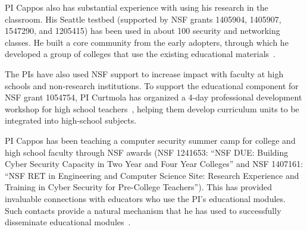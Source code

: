 PI Cappos also has substantial experience with using his research in the
classroom.  His Seattle testbed (supported by NSF grants 1405904,
1405907, 1547290, and 1205415) has been used in about 100
security and networking classes.
He built a core community from the early adopters, through which
he developed a group of colleges that use the existing educational
materials~\cite{NWDCSD}.

The PIs have also used NSF support to increase impact with faculty at high
schools and non-research institutions.
To support the educational component for NSF grant 1054754,
PI Curtmola has organized a 4-day professional development workshop
for high school teachers~\cite{asee14,ccwt14}, helping them
develop curriculum units to be integrated into high-school subjects.

PI Cappos has been teaching a computer
security summer camp for college and high school faculty through NSF
awards (NSF 1241653: ``NSF DUE: Building Cyber Security Capacity in Two Year
and Four Year Colleges'' and NSF 1407161: ``NSF RET in Engineering and
Computer Science Site: Research Experience and Training in Cyber Security for
Pre-College Teachers'').  This has provided invaluable connections with
educators who use the PI's educational modules.  Such contacts provide a
natural mechanism that he has used to successfully disseminate educational
modules~\cite{Cappos_SIGCSE_2014, Hooshangi_SIGCSE_2015}.










